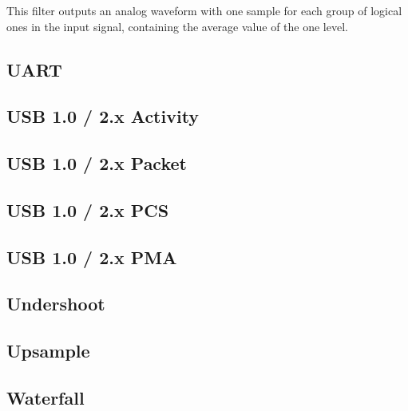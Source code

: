 This filter outputs an analog waveform with one sample for each group of logical ones in the input signal, containing
the average value of the one level.

\pagebreak
\subsection{UART}

\pagebreak
\subsection{USB 1.0 / 2.x Activity}

\pagebreak
\subsection{USB 1.0 / 2.x Packet}

\pagebreak
\subsection{USB 1.0 / 2.x PCS}

\pagebreak
\subsection{USB 1.0 / 2.x PMA}

\pagebreak
\subsection{Undershoot}

\pagebreak
\subsection{Upsample}

\pagebreak
\subsection{Waterfall}
